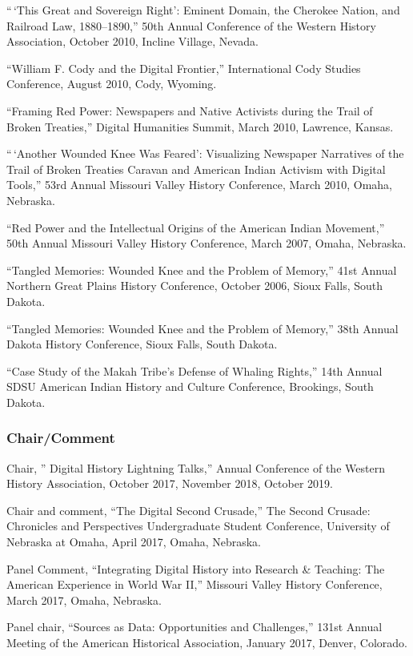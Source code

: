 ``\,`This Great and Sovereign Right': Eminent Domain, the Cherokee
Nation, and Railroad Law, 1880--1890,'' 50th Annual Conference of the
Western History Association, October 2010, Incline Village, Nevada.

``William F. Cody and the Digital Frontier,'' International Cody Studies
Conference, August 2010, Cody, Wyoming.

``Framing Red Power: Newspapers and Native Activists during the Trail of
Broken Treaties,'' Digital Humanities Summit, March 2010, Lawrence,
Kansas.

``\,`Another Wounded Knee Was Feared': Visualizing Newspaper Narratives
of the Trail of Broken Treaties Caravan and American Indian Activism
with Digital Tools,'' 53rd Annual Missouri Valley History Conference,
March 2010, Omaha, Nebraska.

``Red Power and the Intellectual Origins of the American Indian
Movement,'' 50th Annual Missouri Valley History Conference, March 2007,
Omaha, Nebraska.

``Tangled Memories: Wounded Knee and the Problem of Memory,'' 41st
Annual Northern Great Plains History Conference, October 2006, Sioux
Falls, South Dakota.

``Tangled Memories: Wounded Knee and the Problem of Memory,'' 38th
Annual Dakota History Conference, Sioux Falls, South Dakota.

``Case Study of the Makah Tribe's Defense of Whaling Rights,'' 14th
Annual SDSU American Indian History and Culture Conference, Brookings,
South Dakota.

\subsubsection{Chair/Comment}\label{chaircomment}

Chair, '' Digital History Lightning Talks,'' Annual Conference of the
Western History Association, October 2017, November 2018, October 2019.

Chair and comment, ``The Digital Second Crusade,'' The Second Crusade:
Chronicles and Perspectives Undergraduate Student Conference, University
of Nebraska at Omaha, April 2017, Omaha, Nebraska.

Panel Comment, ``Integrating Digital History into Research \& Teaching:
The American Experience in World War II,'' Missouri Valley History
Conference, March 2017, Omaha, Nebraska.

Panel chair, ``Sources as Data: Opportunities and Challenges,'' 131st
Annual Meeting of the American Historical Association, January 2017,
Denver, Colorado.

